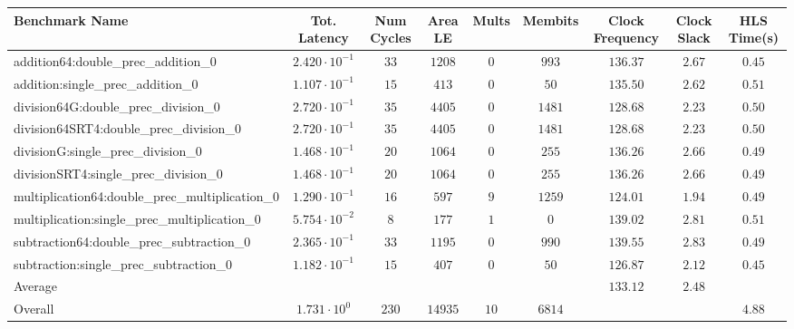 \begin{tabular}{|l|c|c|c|c|c|c|c|c|}
\hline
Benchmark Name                                   & Tot. Latency            & Num Cycles & Area LE   & Mults  & Membits  & Clock Frequency & Clock Slack & HLS Time(s) \\
\hline
addition64:double\_prec\_addition\_0             & $ 2.420 \cdot 10^{-1} $ & $ 33     $ & $ 1208  $ & $ 0  $ & $ 993  $ & $ 136.37      $ & $ 2.67    $ & $ 0.45    $ \\
addition:single\_prec\_addition\_0               & $ 1.107 \cdot 10^{-1} $ & $ 15     $ & $ 413   $ & $ 0  $ & $ 50   $ & $ 135.50      $ & $ 2.62    $ & $ 0.51    $ \\
division64G:double\_prec\_division\_0            & $ 2.720 \cdot 10^{-1} $ & $ 35     $ & $ 4405  $ & $ 0  $ & $ 1481 $ & $ 128.68      $ & $ 2.23    $ & $ 0.50    $ \\
division64SRT4:double\_prec\_division\_0         & $ 2.720 \cdot 10^{-1} $ & $ 35     $ & $ 4405  $ & $ 0  $ & $ 1481 $ & $ 128.68      $ & $ 2.23    $ & $ 0.50    $ \\
divisionG:single\_prec\_division\_0              & $ 1.468 \cdot 10^{-1} $ & $ 20     $ & $ 1064  $ & $ 0  $ & $ 255  $ & $ 136.26      $ & $ 2.66    $ & $ 0.49    $ \\
divisionSRT4:single\_prec\_division\_0           & $ 1.468 \cdot 10^{-1} $ & $ 20     $ & $ 1064  $ & $ 0  $ & $ 255  $ & $ 136.26      $ & $ 2.66    $ & $ 0.49    $ \\
multiplication64:double\_prec\_multiplication\_0 & $ 1.290 \cdot 10^{-1} $ & $ 16     $ & $ 597   $ & $ 9  $ & $ 1259 $ & $ 124.01      $ & $ 1.94    $ & $ 0.49    $ \\
multiplication:single\_prec\_multiplication\_0   & $ 5.754 \cdot 10^{-2} $ & $ 8      $ & $ 177   $ & $ 1  $ & $ 0    $ & $ 139.02      $ & $ 2.81    $ & $ 0.51    $ \\
subtraction64:double\_prec\_subtraction\_0       & $ 2.365 \cdot 10^{-1} $ & $ 33     $ & $ 1195  $ & $ 0  $ & $ 990  $ & $ 139.55      $ & $ 2.83    $ & $ 0.49    $ \\
subtraction:single\_prec\_subtraction\_0         & $ 1.182 \cdot 10^{-1} $ & $ 15     $ & $ 407   $ & $ 0  $ & $ 50   $ & $ 126.87      $ & $ 2.12    $ & $ 0.45    $ \\
\hline
Average                                          & $                     $ & $        $ & $       $ & $    $ & $      $ & $ 133.12      $ & $ 2.48    $ & $         $ \\
\hline
Overall                                          & $ 1.731 \cdot 10^{0}  $ & $ 230    $ & $ 14935 $ & $ 10 $ & $ 6814 $ & $             $ & $         $ & $ 4.88    $ \\
\hline
\end{tabular}

